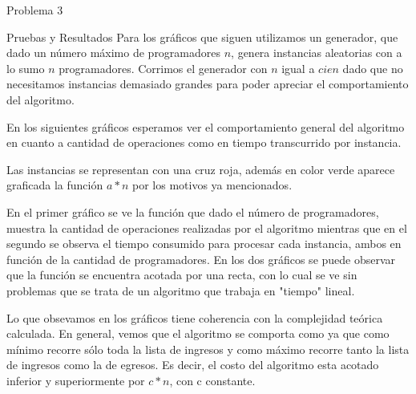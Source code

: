 \begin{section}{Problema 3}
\begin{subsection}{Pruebas y Resultados}
	Para los gráficos que siguen utilizamos un generador, que dado un número máximo de programadores $n$, genera instancias aleatorias con a lo sumo $n$ programadores. Corrimos el generador con $n$ igual a $cien$ dado que no necesitamos instancias demasiado grandes para poder apreciar el comportamiento del algoritmo.

	En los siguientes gráficos esperamos ver el comportamiento general del algoritmo en cuanto a cantidad de operaciones como en tiempo transcurrido por instancia.
	
	Las instancias se representan con una cruz roja, además en color verde aparece graficada la función $a*n$ por los motivos ya mencionados.\VSP

	\VSP
	
	\VSP

	En el primer gráfico se ve la función que dado el número de programadores, muestra la cantidad de operaciones realizadas por el algoritmo mientras que en el segundo se observa el tiempo consumido para procesar cada instancia, ambos en función de la cantidad de programadores.
	En los dos gráficos se puede observar que la función se encuentra acotada por una recta, con lo cual se ve sin problemas que se trata de un algoritmo que trabaja en "tiempo" lineal.

	Lo que obsevamos en los gráficos tiene coherencia con la complejidad teórica calculada. 
	En general, vemos que el algoritmo se comporta como  ya que como mínimo recorre sólo toda la lista de ingresos y como máximo recorre tanto la lista de ingresos como la de egresos. Es decir, el costo del algoritmo esta acotado inferior y superiormente por $c*n$, con c constante.

	\end{subsection}

\end{section}







